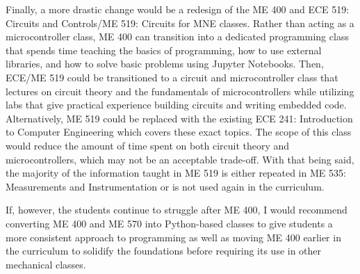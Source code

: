 Finally, a more drastic change would be a redesign of the ME 400 and 
ECE 519: Circuits and Controls/ME 519: Circuits for MNE classes. Rather
than acting as a microcontroller class, ME 400 can transition into a dedicated
programming class that spends time teaching the basics of programming, how
to use external libraries, and how to solve basic problems using Jupyter
Notebooks. Then, ECE/ME 519 could be transitioned to a circuit and 
microcontroller class that lectures on circuit theory and the fundamentals
of microcontrollers while utilizing labs that give practical experience building
circuits and writing embedded code. Alternatively, ME 519 could be replaced 
with the existing ECE 241: Introduction to Computer Engineering which covers 
these exact topics. The scope of this class would reduce
the amount of time spent on both circuit theory and microcontrollers, which
may not be an acceptable trade-off. With that being said, the majority
of the information taught in ME 519 is either repeated in ME 535:
Measurements and Instrumentation or is not used again in the curriculum.

If, however, the students continue to struggle after ME 400, I would 
recommend converting ME 400 and ME 570 into Python-based classes to give
students a more consistent approach to programming as well as moving 
ME 400 earlier in the curriculum to solidify the foundations before 
requiring its use in other mechanical classes.
